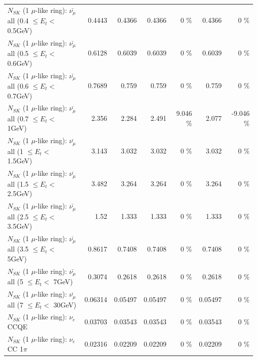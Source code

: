 \begin{table}
\begin{tabular}{| l | r | r | r  r | r  r |}
 $N_{SK}$ (1 $\mu$-like ring): $\bar{\nu_{\mu}}$ all (0.4 $\leq E_{t} <$ 0.5GeV) &          0.4443 &          0.4366 &          0.4366 &        0 \%  &          0.4366 &        0 \%  \\ 
 $N_{SK}$ (1 $\mu$-like ring): $\bar{\nu_{\mu}}$ all (0.5 $\leq E_{t} <$ 0.6GeV) &          0.6128 &          0.6039 &          0.6039 &        0 \%  &          0.6039 &        0 \%  \\ 
 $N_{SK}$ (1 $\mu$-like ring): $\bar{\nu_{\mu}}$ all (0.6 $\leq E_{t} <$ 0.7GeV) &          0.7689 &           0.759 &           0.759 &        0 \%  &           0.759 &        0 \%  \\ 
   $N_{SK}$ (1 $\mu$-like ring): $\bar{\nu_{\mu}}$ all (0.7 $\leq E_{t} <$ 1GeV) &           2.356 &           2.284 &           2.491 &    9.046 \%  &           2.077 &   -9.046 \%  \\ 
   $N_{SK}$ (1 $\mu$-like ring): $\bar{\nu_{\mu}}$ all (1 $\leq E_{t} <$ 1.5GeV) &           3.143 &           3.032 &           3.032 &        0 \%  &           3.032 &        0 \%  \\ 
 $N_{SK}$ (1 $\mu$-like ring): $\bar{\nu_{\mu}}$ all (1.5 $\leq E_{t} <$ 2.5GeV) &           3.482 &           3.264 &           3.264 &        0 \%  &           3.264 &        0 \%  \\ 
 $N_{SK}$ (1 $\mu$-like ring): $\bar{\nu_{\mu}}$ all (2.5 $\leq E_{t} <$ 3.5GeV) &            1.52 &           1.333 &           1.333 &        0 \%  &           1.333 &        0 \%  \\ 
   $N_{SK}$ (1 $\mu$-like ring): $\bar{\nu_{\mu}}$ all (3.5 $\leq E_{t} <$ 5GeV) &          0.8617 &          0.7408 &          0.7408 &        0 \%  &          0.7408 &        0 \%  \\ 
     $N_{SK}$ (1 $\mu$-like ring): $\bar{\nu_{\mu}}$ all (5 $\leq E_{t} <$ 7GeV) &          0.3074 &          0.2618 &          0.2618 &        0 \%  &          0.2618 &        0 \%  \\ 
    $N_{SK}$ (1 $\mu$-like ring): $\bar{\nu_{\mu}}$ all (7 $\leq E_{t} <$ 30GeV) &         0.06314 &         0.05497 &         0.05497 &        0 \%  &         0.05497 &        0 \%  \\ 
\hline
\hline
\hline
                                      $N_{SK}$ (1 $\mu$-like ring): $\nu_e$ CCQE &         0.03703 &         0.03543 &         0.03543 &        0 \%  &         0.03543 &        0 \%  \\ 
                                 $N_{SK}$ (1 $\mu$-like ring): $\nu_e$ CC 1$\pi$ &         0.02316 &         0.02209 &         0.02209 &        0 \%  &         0.02209 &        0 \%  \\ 

\end{tabular}
\end{table}
